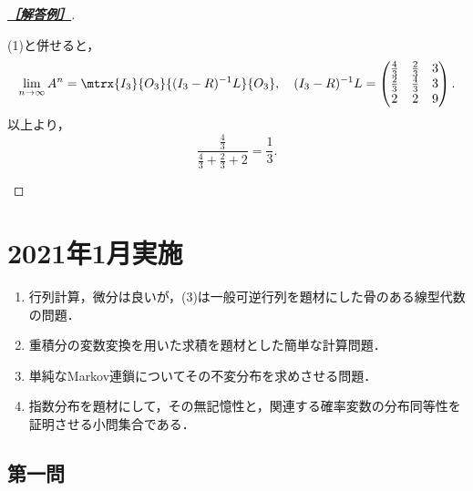 \documentclass[uplatex,dvipdfmx]{jsarticle}
\begin{document}
\begin{proof}[\textbf{\underline{［解答例］}}]
\begin{enumerate}
        (1)と併せると，
        \[\lim_{n\to\infty}A^n=\mtrx{I_3}{O_3}{(I_3-R)^{-1}L}{O_3},\quad (I_3-R)^{-1}L=\begin{pmatrix}\frac{4}{3}&\frac{2}{3}&3\\\frac{2}{3}&\frac{4}{3}&3\\2&2&9\end{pmatrix}.\]
        以上より，
        \[\frac{\frac{4}{3}}{\frac{4}{3}+\frac{2}{3}+2}=\frac{1}{3}.\]
    \end{enumerate}
\end{proof}

\section{2021年1月実施}

\begin{tcolorbox}[colframe=ForestGreen, colback=ForestGreen!10!white,breakable,colbacktitle=ForestGreen!40!white,coltitle=black,fonttitle=\bfseries\sffamily,
    title=概観]
    \begin{enumerate}[{第}1{問}]
        \item 行列計算，微分は良いが，(3)は一般可逆行列を題材にした骨のある線型代数の問題．
        \item 重積分の変数変換を用いた求積を題材とした簡単な計算問題．
        \item 単純なMarkov連鎖についてその不変分布を求めさせる問題．
        \item 指数分布を題材にして，その無記憶性と，関連する確率変数の分布同等性を証明させる小問集合である．
    \end{enumerate}
\end{tcolorbox}

\subsection{第一問}
\end{document}

